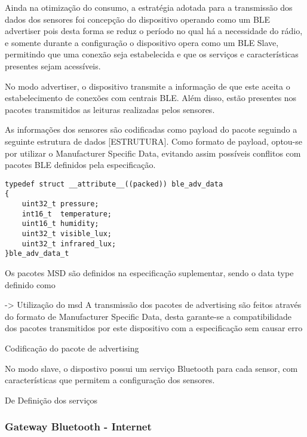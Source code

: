 Ainda na otimização do consumo, a estratégia adotada para a transmissão dos dados dos sensores foi concepção do dispositivo operando como um BLE advertiser pois desta forma se reduz o período no qual há a necessidade do rádio, e somente durante a configuração o dispositivo opera como um BLE Slave, permitindo que uma conexão seja estabelecida e que os serviços e características presentes sejam acessíveis.

No modo advertiser, o dispositivo transmite a informação de que este aceita o estabelecimento de conexões com centrais BLE. Além disso, estão presentes nos pacotes transmitidos as leituras realizadas pelos sensores.

As informações dos sensores são codificadas como payload do pacote seguindo a seguinte estrutura de dados [ESTRUTURA]. Como formato de payload, optou-se por utilizar o Manufacturer Specific Data, evitando assim possíveis conflitos com pacotes BLE definidos pela especificação.

\begin{lstlisting}[frame=single]
typedef struct __attribute__((packed)) ble_adv_data
{
    uint32_t pressure;
    int16_t  temperature;
    uint16_t humidity;
    uint32_t visible_lux;
    uint32_t infrared_lux;
}ble_adv_data_t
\end{lstlisting}
Os pacotes MSD são definidos na especificação suplementar, sendo o data type definido como  

-> Utilização do msd
A transmissão dos pacotes de advertising são feitos através do formato de Manufacturer Specific Data, desta garante-se a compatibilidade dos pacotes transmitidos por este dispositivo com a especificação sem causar erro

Codificação do pacote de advertising

No modo slave, o dispostivo possui um serviço Bluetooth para cada sensor, com características que permitem a configuração dos sensores. 

De
Definição dos serviços



\subsubsection{Gateway Bluetooth - Internet}




